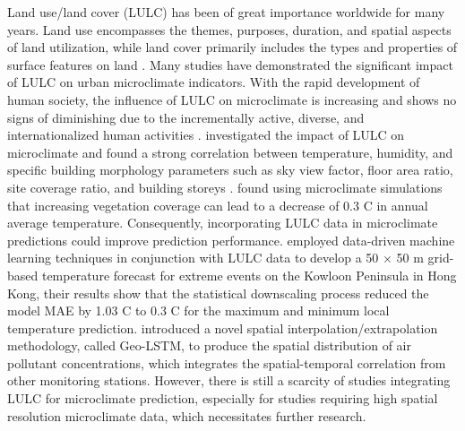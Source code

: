\documentclass[a4paper,fleqn]{cas-sc}
\begin{document}
Land use/land cover (LULC) has been of great importance worldwide for many years. Land use encompasses the themes, purposes, duration, and spatial aspects of land utilization, while land cover primarily includes the types and properties of surface features on land \citep{nedd2021synthesis}. Many studies have demonstrated the significant impact of LULC on urban microclimate indicators. With the rapid development of human society, the influence of LULC on microclimate is increasing and shows no signs of diminishing due to the incrementally active, diverse, and internationalized human activities \citep{caballero2022land, naikoo2022land,abdullah2022investigating}. \cite{zhang2022impact} investigated the impact of LULC on microclimate and found a strong correlation between temperature, humidity, and specific building morphology parameters such as sky view factor, floor area ratio, site coverage ratio, and building storeys \citep{wei2016impact}. \cite{erell2022effect} found using microclimate simulations that increasing vegetation coverage can lead to a decrease of 0.3 \textdegree C in annual average temperature. Consequently, incorporating LULC data in microclimate predictions could improve prediction performance. \cite{chang2021development} employed data-driven machine learning techniques in conjunction with LULC data to develop a 50 $\times$ 50 m grid-based temperature forecast for extreme events on the Kowloon Peninsula in Hong Kong, their results show that the statistical downscaling process reduced the model MAE by 1.03 \textdegree C to 0.3 \textdegree C for the maximum and minimum local temperature prediction. \cite{ma2019temporal} introduced a novel spatial interpolation/extrapolation methodology, called Geo-LSTM, to produce the spatial distribution of air pollutant concentrations, which integrates the spatial-temporal correlation from other monitoring stations.  However, there is still a scarcity of studies integrating LULC for microclimate prediction, especially for studies requiring high spatial resolution microclimate data, which necessitates further research.

\end{document}

